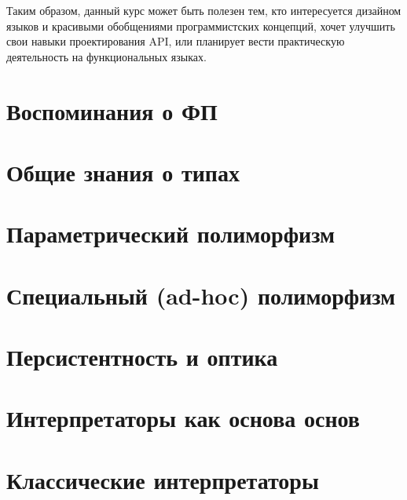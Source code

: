 \documentclass[12pt]{article}
\begin{document}
    Таким образом, данный курс может быть полезен тем, кто интересуется дизайном языков и красивыми обобщениями программистских концепций, хочет улучшить свои навыки проектирования API, или планирует вести практическую деятельность на функциональных языках.


    \clearpage


    \section{Воспоминания о ФП}

%    

    \clearpage


    \section{Общие знания о типах}

    

    \clearpage


    \section{Параметрический полиморфизм}
%
%    
%


    \section{Специальный (ad-hoc) полиморфизм} \label{sec:ad-hoc}
%
%    
%


    \section{Персистентность и оптика}
%
%    
%


    \section{Интерпретаторы как основа основ}



    \section{Классические интерпретаторы}

%    
%
\end{document}
